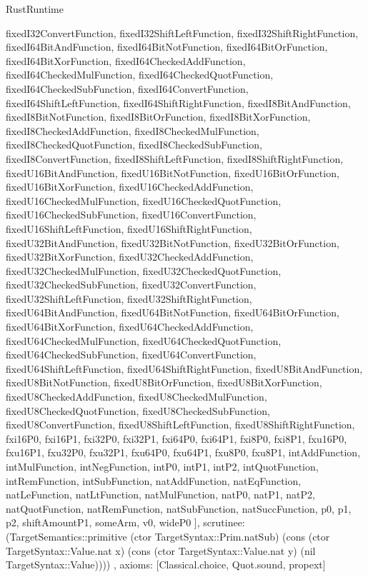 \begin{lexlean}{RustRuntime}
\begin{semanticmodule}
{{      fixedI32ConvertFunction,
      fixedI32ShiftLeftFunction,
      fixedI32ShiftRightFunction,
      fixedI64BitAndFunction,
      fixedI64BitNotFunction,
      fixedI64BitOrFunction,
      fixedI64BitXorFunction,
      fixedI64CheckedAddFunction,
      fixedI64CheckedMulFunction,
      fixedI64CheckedQuotFunction,
      fixedI64CheckedSubFunction,
      fixedI64ConvertFunction,
      fixedI64ShiftLeftFunction,
      fixedI64ShiftRightFunction,
      fixedI8BitAndFunction,
      fixedI8BitNotFunction,
      fixedI8BitOrFunction,
      fixedI8BitXorFunction,
      fixedI8CheckedAddFunction,
      fixedI8CheckedMulFunction,
      fixedI8CheckedQuotFunction,
      fixedI8CheckedSubFunction,
      fixedI8ConvertFunction,
      fixedI8ShiftLeftFunction,
      fixedI8ShiftRightFunction,
      fixedU16BitAndFunction,
      fixedU16BitNotFunction,
      fixedU16BitOrFunction,
      fixedU16BitXorFunction,
      fixedU16CheckedAddFunction,
      fixedU16CheckedMulFunction,
      fixedU16CheckedQuotFunction,
      fixedU16CheckedSubFunction,
      fixedU16ConvertFunction,
      fixedU16ShiftLeftFunction,
      fixedU16ShiftRightFunction,
      fixedU32BitAndFunction,
      fixedU32BitNotFunction,
      fixedU32BitOrFunction,
      fixedU32BitXorFunction,
      fixedU32CheckedAddFunction,
      fixedU32CheckedMulFunction,
      fixedU32CheckedQuotFunction,
      fixedU32CheckedSubFunction,
      fixedU32ConvertFunction,
      fixedU32ShiftLeftFunction,
      fixedU32ShiftRightFunction,
      fixedU64BitAndFunction,
      fixedU64BitNotFunction,
      fixedU64BitOrFunction,
      fixedU64BitXorFunction,
      fixedU64CheckedAddFunction,
      fixedU64CheckedMulFunction,
      fixedU64CheckedQuotFunction,
      fixedU64CheckedSubFunction,
      fixedU64ConvertFunction,
      fixedU64ShiftLeftFunction,
      fixedU64ShiftRightFunction,
      fixedU8BitAndFunction,
      fixedU8BitNotFunction,
      fixedU8BitOrFunction,
      fixedU8BitXorFunction,
      fixedU8CheckedAddFunction,
      fixedU8CheckedMulFunction,
      fixedU8CheckedQuotFunction,
      fixedU8CheckedSubFunction,
      fixedU8ConvertFunction,
      fixedU8ShiftLeftFunction,
      fixedU8ShiftRightFunction,
      fxi16P0,
      fxi16P1,
      fxi32P0,
      fxi32P1,
      fxi64P0,
      fxi64P1,
      fxi8P0,
      fxi8P1,
      fxu16P0,
      fxu16P1,
      fxu32P0,
      fxu32P1,
      fxu64P0,
      fxu64P1,
      fxu8P0,
      fxu8P1,
      intAddFunction,
      intMulFunction,
      intNegFunction,
      intP0,
      intP1,
      intP2,
      intQuotFunction,
      intRemFunction,
      intSubFunction,
      natAddFunction,
      natEqFunction,
      natLeFunction,
      natLtFunction,
      natMulFunction,
      natP0,
      natP1,
      natP2,
      natQuotFunction,
      natRemFunction,
      natSubFunction,
      natSuccFunction,
      p0,
      p1,
      p2,
      shiftAmountP1,
      someArm,
      v0,
      wideP0
    ],
    scrutinee: (TargetSemantics::primitive (ctor TargetSyntax::Prim.natSub) (cons (ctor TargetSyntax::Value.nat x) (cons (ctor TargetSyntax::Value.nat y) (nil TargetSyntax::Value))))
  },
  axioms: [Classical.choice, Quot.sound, propext]
}


\end{semanticmodule}
\end{lexlean}
